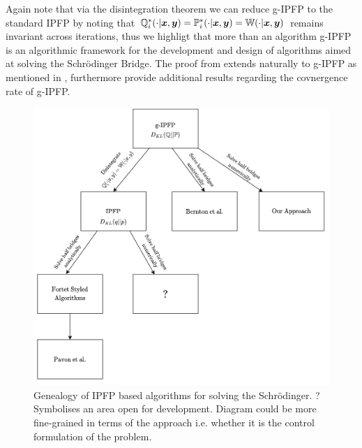 \documentclass[a4paper,12pt,twoside,openright]{report}
\theoremstyle{definition}
\begin{document}
Again note that via the disintegration theorem we can reduce g-IPFP to the standard IPFP by noting that ${\mathbb{Q}}^*_i(\cdot |{\bm{x}},{\bm{y}}) ={\mathbb{P}}^*_i(\cdot |{\bm{x}},{\bm{y}}) = \mathbb{W}(\cdot |{\bm{x}},{\bm{y}})$ remains invariant across iterations, thus we highligt that more than an algorithm g-IPFP is an algorithmic framework for the development and design of algorithms aimed at solving the Schrödinger Bridge.
The proof from \cite{ruschendorf1995convergence} extends naturally to g-IPFP as mentioned in \cite{bernton2019schr}, furthermore \cite{bernton2019schr} provide additional results regarding the covnergence rate of g-IPFP.
\begin{figure}[h!]
    \centering
    \includegraphics[width=\linewidth]{images/IPFP_Geanology.png}
    \caption{Genealogy of IPFP based algorithms for solving the Schrödinger. ? Symbolises an area open for development. Diagram could be more fine-grained in terms of the approach i.e. whether it is the control formulation of the problem. }
    \label{fig:genealogy}
\end{figure}

\end{document}
